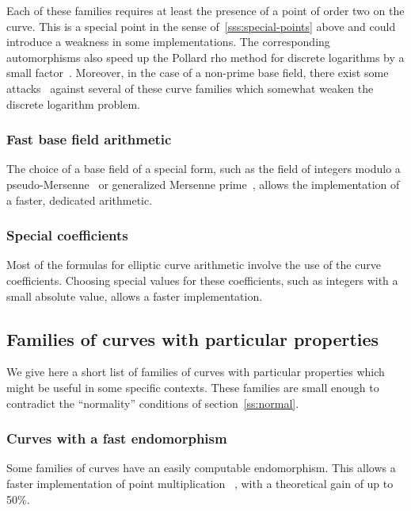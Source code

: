 \documentclass[twocolumn,letterpaper]{article}
\begin{document}
Each of these families requires at least
the presence of a point of order two on the curve.
This is a special point in the sense of~\ref{sss:special-points} above
and could introduce a weakness in some implementations.
The corresponding automorphisms also speed up the Pollard rho
method for discrete logarithms by a small factor~\cite{moc2000glv}.
Moreover, in the case of a non-prime base field,
there exist some attacks~\cite{jc2014fghr}
against several of these curve families
which somewhat weaken the discrete logarithm problem.

\subsubsection{Fast base field arithmetic}
\label{sss:special-fast}

The choice of a base field of a special form,
such as the field of integers modulo
a pseudo-Mersenne~\cite{pkc2006bernstein}
or generalized Mersenne prime~\cite{nist2000fips186-2},
allows the implementation of a faster, dedicated arithmetic.

\subsubsection{Special coefficients}

Most of the formulas for elliptic curve arithmetic
involve the use of the curve coefficients.
Choosing special values for these coefficients,
such as integers with a small absolute value,
allows a faster implementation.

\subsection{Families of curves with particular properties}
\label{ss:particular}

We give here a short list of families of curves
with particular properties which might be useful in some specific contexts.
These families are small enough
to contradict the ``normality'' conditions of section~\ref{ss:normal}.

\subsubsection{Curves with a fast endomorphism}

Some families of curves have an easily computable endomorphism.
This allows a faster implementation of point multiplication%
~\cite{crypto2001glv,joc2011gls}, with a theoretical gain of up to 50\%.
\end{document}
